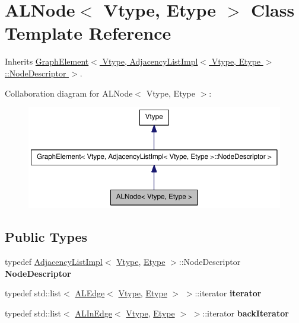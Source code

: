 \hypertarget{class_a_l_node}{
\section{ALNode$<$ Vtype, Etype $>$ Class Template Reference}
\label{class_a_l_node}
}


Inherits \hyperlink{class_graph_element}{GraphElement$<$ Vtype, AdjacencyListImpl$<$ Vtype, Etype $>$::NodeDescriptor $>$}.



Collaboration diagram for ALNode$<$ Vtype, Etype $>$:\nopagebreak
\begin{figure}[H]
\begin{center}
\leavevmode
\includegraphics[width=400pt]{class_a_l_node__coll__graph}
\end{center}
\end{figure}
\subsection*{Public Types}
\begin{DoxyCompactItemize}
\item 
\hypertarget{class_a_l_node_a789aea75e25b92b20a144adb0e9dc64b}{
typedef \hyperlink{class_adjacency_list_impl}{AdjacencyListImpl}$<$ \hyperlink{class_vtype}{Vtype}, \hyperlink{class_etype}{Etype} $>$::NodeDescriptor {\bfseries NodeDescriptor}}
\label{class_a_l_node_a789aea75e25b92b20a144adb0e9dc64b}

\item 
\hypertarget{class_a_l_node_af583e17ec3b852f4524f6f5ef695873b}{
typedef std::list$<$ \hyperlink{class_a_l_edge}{ALEdge}$<$ \hyperlink{class_vtype}{Vtype}, \hyperlink{class_etype}{Etype} $>$ $>$::iterator {\bfseries iterator}}
\label{class_a_l_node_af583e17ec3b852f4524f6f5ef695873b}

\item 
\hypertarget{class_a_l_node_ae7bc0dd6b479187e9800a6d0756778ba}{
typedef std::list$<$ \hyperlink{class_a_l_in_edge}{ALInEdge}$<$ \hyperlink{class_vtype}{Vtype}, \hyperlink{class_etype}{Etype} $>$ $>$::iterator {\bfseries backIterator}}
\label{class_a_l_node_ae7bc0dd6b479187e9800a6d0756778ba}

\end{DoxyCompactItemize}
